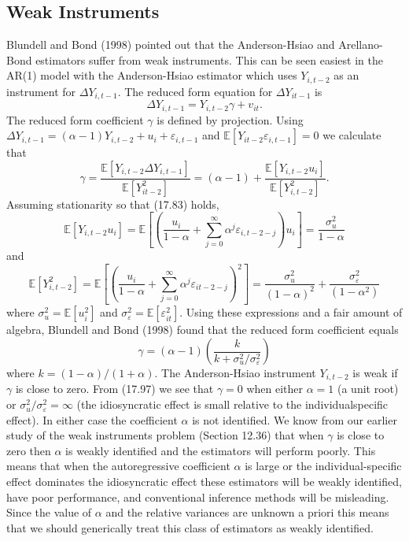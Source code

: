\documentclass[10pt]{article}
\begin{document}
\subsection{Weak Instruments}
Blundell and Bond (1998) pointed out that the Anderson-Hsiao and Arellano-Bond estimators suffer from weak instruments. This can be seen easiest in the AR(1) model with the Anderson-Hsiao estimator which uses $Y_{i, t-2}$ as an instrument for $\Delta Y_{i, t-1}$. The reduced form equation for $\Delta Y_{i t-1}$ is
$$
\Delta Y_{i, t-1}=Y_{i, t-2} \gamma+v_{i t} .
$$
The reduced form coefficient $\gamma$ is defined by projection. Using $\Delta Y_{i, t-1}=(\alpha-1) Y_{i, t-2}+u_{i}+\varepsilon_{i, t-1}$ and $\mathbb{E}\left[Y_{i t-2} \varepsilon_{i, t-1}\right]=0$ we calculate that
$$
\gamma=\frac{\mathbb{E}\left[Y_{i, t-2} \Delta Y_{i, t-1}\right]}{\mathbb{E}\left[Y_{i t-2}^{2}\right]}=(\alpha-1)+\frac{\mathbb{E}\left[Y_{i, t-2} u_{i}\right]}{\mathbb{E}\left[Y_{i, t-2}^{2}\right]} .
$$
Assuming stationarity so that (17.83) holds,
$$
\mathbb{E}\left[Y_{i, t-2} u_{i}\right]=\mathbb{E}\left[\left(\frac{u_{i}}{1-\alpha}+\sum_{j=0}^{\infty} \alpha^{j} \varepsilon_{i, t-2-j}\right) u_{i}\right]=\frac{\sigma_{u}^{2}}{1-\alpha}
$$
and
$$
\mathbb{E}\left[Y_{i, t-2}^{2}\right]=\mathbb{E}\left[\left(\frac{u_{i}}{1-\alpha}+\sum_{j=0}^{\infty} \alpha^{j} \varepsilon_{i t-2-j}\right)^{2}\right]=\frac{\sigma_{u}^{2}}{(1-\alpha)^{2}}+\frac{\sigma_{\varepsilon}^{2}}{\left(1-\alpha^{2}\right)}
$$
where $\sigma_{u}^{2}=\mathbb{E}\left[u_{i}^{2}\right]$ and $\sigma_{\varepsilon}^{2}=\mathbb{E}\left[\varepsilon_{i t}^{2}\right]$. Using these expressions and a fair amount of algebra, Blundell and Bond (1998) found that the reduced form coefficient equals
$$
\gamma=(\alpha-1)\left(\frac{k}{k+\sigma_{u}^{2} / \sigma_{\varepsilon}^{2}}\right)
$$
where $k=(1-\alpha) /(1+\alpha)$. The Anderson-Hsiao instrument $Y_{i, t-2}$ is weak if $\gamma$ is close to zero. From (17.97) we see that $\gamma=0$ when either $\alpha=1$ (a unit root) or $\sigma_{u}^{2} / \sigma_{\varepsilon}^{2}=\infty$ (the idiosyncratic effect is small relative to the individualspecific effect). In either case the coefficient $\alpha$ is not identified. We know from our earlier study of the weak instruments problem (Section 12.36) that when $\gamma$ is close to zero then $\alpha$ is weakly identified and the estimators will perform poorly. This means that when the autoregressive coefficient $\alpha$ is large or the individual-specific effect dominates the idiosyncratic effect these estimators will be weakly identified, have poor performance, and conventional inference methods will be misleading. Since the value of $\alpha$ and the relative variances are unknown a priori this means that we should generically treat this class of estimators as weakly identified.
\end{document}
